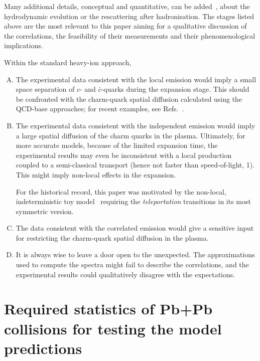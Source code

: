\documentclass[floatfix,superscriptaddress,a4paper,
               showpieces,showkeys,nofootinbib,preprint]{revtex4-2}
\begin{document}
Many additional details, conceptual and quantitative, can be added~\cite{Florkowski:Phenomenology}, about the hydrodynamic evolution or the rescattering after hadronisation. The stages listed above are the most relevant to this paper aiming for a qualitative discussion of the correlations, the feasibility of their measurements and their phenomenological implications. 

Within the standard heavy-ion approach,
\begin{enumerate}[(A)]
\item
The experimental data consistent with the local emission would imply a small
space separation of $c$- and $\bar{c}$-quarks during the expansion stage.
This should be confronted with the charm-quark spatial diffusion calculated using the QCD-base approaches; for recent examples, see Refs.~\cite{Sambataro:2020pge,Capellino:2022nvf,Satapathy:2022xdw}.
\item
The experimental data consistent with the independent emission would imply a large spatial diffusion of the charm quarks in the plasma. 
Ultimately, for more accurate models, because of the limited expansion time, the experimental results may even be inconsistent with a local production coupled to a semi-classical transport (hence not faster than speed-of-light, 1). This might imply non-local effects in the expansion. 

For the historical record, this paper was motivated by the non-local, indeterministic toy model~\cite{Gazdzicki:2022zej} requiring the \textit{teleportation} transitions in its most symmetric version.
\item
The data consistent with the correlated emission would give a sensitive input for restricting the charm-quark spatial diffusion in the plasma.

\item
It is always wise to leave a door open to the unexpected. The approximations used to compute the spectra  might fail to describe the correlations, and the experimental results could qualitatively disagree with the expectations.  

\end{enumerate}


\vspace{1cm}
\section{Required statistics of Pb+Pb collisions for testing the model predictions}
\label{sec:experiment}
\end{document}

